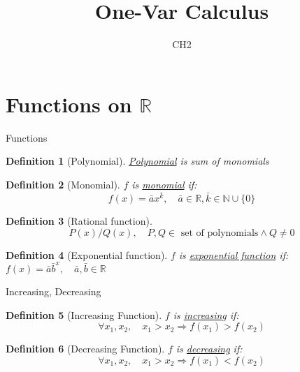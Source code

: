 \documentclass[final]{beamer}
\author[조남운]{\mail}
\title{One-Var Calculus}
\subtitle{CH2}
\newtheorem{defn}{Definition}
\begin{document}
	\maketitle


\section{Functions on $\mathbb{R}$} %
\begin{frame}[t]{Functions}

	\begin{defn}[Polynomial]
		\uline{Polynomial} is sum of monomials
	\end{defn}
	
	\begin{defn}[Monomial]
		$f$ is \uline{monomial} if:
			\[
				f(x) = \bar a x^{\bar k},\quad \bar a \in \mathbb{R}, \bar k\in \mathbb{N}\cup\{0\}
			\]
	\end{defn}

	\begin{defn}
		[Rational function]
		\[
			P(x)/Q(x),\quad \text{$P,Q \in$ set of polynomials} \land Q\neq 0
		\]
	\end{defn}
	
	\begin{defn}
		[Exponential function]
		$f$ is \uline{exponential function} if: $
			f(x) = \bar a {\bar b}^x,\quad \bar a, \bar b \in \mathbb{R}
		$
	\end{defn}

\end{frame}

\begin{frame}[t]{Increasing, Decreasing}
	\begin{defn}
		[Increasing Function]
		$f$ is \uline{increasing} if:\[
			\forall x_1,x_2, \quad x_1 >x_2 \Rightarrow f(x_1)>f(x_2)
		\]
	\end{defn}
	\begin{defn}
		[Decreasing Function]
		$f$ is \uline{decreasing} if:\[
			\forall x_1,x_2, \quad x_1 >x_2 \Rightarrow f(x_1)<f(x_2)
		\]
	\end{defn}
\end{frame}
\end{document}
